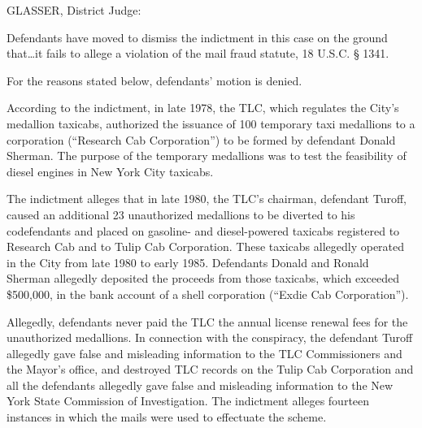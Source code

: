 

GLASSER, District Judge:

Defendants have moved to dismiss the indictment in this case on the ground
that\ldots it fails to allege a violation of the mail fraud statute, 18 U.S.C.
{\S} 1341.

For the reasons stated below, defendants' motion is denied.


According to the indictment, in late 1978, the TLC, which regulates the City's
medallion taxicabs, authorized the issuance of 100 temporary taxi medallions to
a corporation (``Research Cab Corporation'') to be formed by defendant Donald
Sherman. The purpose of the temporary medallions was to test the feasibility of
diesel engines in New York City taxicabs.

The indictment alleges that in late 1980, the TLC's chairman, defendant Turoff,
caused an additional 23 unauthorized medallions to be diverted to his
codefendants and placed on gasoline- and diesel-powered taxicabs registered to
Research Cab and to Tulip Cab Corporation. These taxicabs allegedly operated in
the City from late 1980 to early 1985. Defendants Donald and Ronald Sherman
allegedly deposited the proceeds from those taxicabs, which exceeded \$500,000,
in the bank account of a shell corporation (``Exdie Cab Corporation'').

Allegedly, defendants never paid the TLC the annual license renewal fees for the
unauthorized medallions. In connection with the conspiracy, the defendant
Turoff allegedly gave false and misleading information to the TLC Commissioners
and the Mayor's office, and destroyed TLC records on the Tulip Cab Corporation
and all the defendants allegedly gave false and misleading information to the
New York State Commission of Investigation. The indictment alleges fourteen
instances in which the mails were used to effectuate the scheme.


